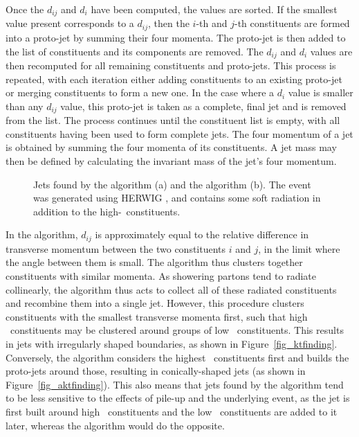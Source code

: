 Once the $d_{ij}$ and $d_i$ have been computed, the values are sorted. If the smallest value present corresponds to a $d_{ij}$, then the $i$-th and $j$-th constituents are formed into a proto-jet by summing their four momenta. The proto-jet is then added to the list of constituents and its components are removed. The $d_{ij}$ and $d_i$ values are then recomputed for all remaining constituents and proto-jets. This process is repeated, with each iteration either adding constituents to an existing proto-jet or merging constituents to form a new one. In the case where a $d_i$ value is smaller than any $d_{ij}$ value, this proto-jet is taken as a complete, final jet and is removed from the list. The process continues until the constituent list is empty, with all constituents having been used to form complete jets. The four momentum of a jet is obtained by summing the four momenta of its constituents. A jet mass may then be defined by calculating the invariant mass of the jet's four momentum.


\begin{figure}[hbt]
\begin{centering}
\caption[Comparison of \kt and \akt jet finding algorithms]{Jets found by the \kt algorithm (a) and the \akt algorithm (b). The event was generated using HERWIG \cite{Herwig}, and contains some soft radiation in addition to the high-\pt~constituents\cite{Cacciari:2008gp}.} 
\end{centering}
\end{figure}

In the \kt algorithm, $d_{ij}$ is approximately equal to the relative difference in transverse momentum between the two constituents $i$ and $j$, in the limit where the angle between them is small. The \kt algorithm thus clusters together constituents with similar momenta. As showering partons tend to radiate collinearly, the \kt algorithm thus acts to collect all of these radiated constituents and recombine them into a single jet. However, this procedure clusters constituents with the smallest transverse momenta first, such that high \pt~constituents may be clustered around groups of low \pt~constituents. This results in jets with irregularly shaped boundaries, as shown in Figure~\ref{fig_ktfinding}. Conversely, the \akt algorithm considers the highest \pt~constituents first and builds the proto-jets around those, resulting in conically-shaped jets (as shown in Figure~\ref{fig_aktfinding}). This also means that jets found by the \akt algorithm tend to be less sensitive to the effects of pile-up and the underlying event\cite{Cacciari:2008gp}, as the jet is first built around high \pt~constituents and the low \pt~constituents are added to it later, whereas the \kt algorithm would do the opposite.

